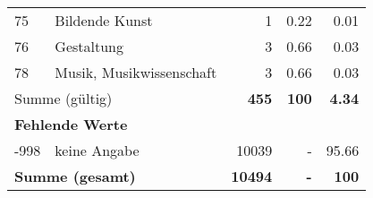 \begin{longtable}{lXrrr}
        75 & \multicolumn{1}{X}{Bildende Kunst} & %
          \num{1} &
          \num[round-mode=places,round-precision=2]{0,22} &
          \num[round-mode=places,round-precision=2]{0,01} \\

        76 & \multicolumn{1}{X}{Gestaltung} & %
          \num{3} &
          \num[round-mode=places,round-precision=2]{0,66} &
          \num[round-mode=places,round-precision=2]{0,03} \\

        78 & \multicolumn{1}{X}{Musik, Musikwissenschaft} & %
          \num{3} &
          \num[round-mode=places,round-precision=2]{0,66} &
          \num[round-mode=places,round-precision=2]{0,03} \\

     \midrule
     \multicolumn{2}{l}{Summe (gültig)} &
       \textbf{\num{455}} &
     \textbf{100} &
       \textbf{\num[round-mode=places,round-precision=2]{4,34}} \\
     \multicolumn{5}{l}{\textbf{Fehlende Werte}}\\
       -998 &
       keine Angabe &
         \num{10039} &
        - &
         \num[round-mode=places,round-precision=2]{95,66} \\
     \midrule
     \multicolumn{2}{l}{\textbf{Summe (gesamt)}} &
          \textbf{\num{10494}} &
        \textbf{-} &
        \textbf{100} \\
     \bottomrule
     \end{longtable}
     

